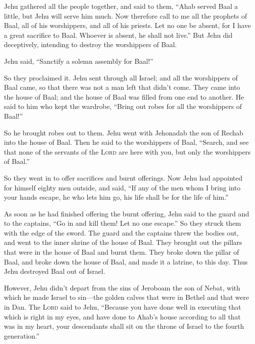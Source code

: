  Jehu gathered all the people together, and said to them,
``Ahab served Baal a little, but Jehu will serve him much.
 Now therefore call to me all the prophets of Baal, all
of his worshippers, and all of his priests. Let no one be absent, for I
have a great sacrifice to Baal. Whoever is absent, he shall not live.''
But Jehu did deceptively, intending to destroy the worshippers of Baal.

 Jehu said, ``Sanctify a solemn assembly for Baal!''

So they proclaimed it.  Jehu sent through all Israel; and
all the worshippers of Baal came, so that there was not a man left that
didn't come. They came into the house of Baal; and the house of Baal was
filled from one end to another.  He said to him who kept
the wardrobe, ``Bring out robes for all the worshippers of Baal!''

So he brought robes out to them.  Jehu went with
Jehonadab the son of Rechab into the house of Baal. Then he said to the
worshippers of Baal, ``Search, and see that none of the servants of the
\textsc{Lord} are here with you, but only the worshippers of Baal.''

 So they went in to offer sacrifices and burnt offerings.
Now Jehu had appointed for himself eighty men outside, and said, ``If
any of the men whom I bring into your hands escape, he who lets him go,
his life shall be for the life of him.''

 As soon as he had finished offering the burnt offering,
Jehu said to the guard and to the captains, ``Go in and kill them! Let
no one escape.'' So they struck them with the edge of the sword. The
guard and the captains threw the bodies out, and went to the inner
shrine of the house of Baal.  They brought out the
pillars that were in the house of Baal and burnt them. 
They broke down the pillar of Baal, and broke down the house of Baal,
and made it a latrine, to this day.  Thus Jehu destroyed
Baal out of Israel.

 However, Jehu didn't depart from the sins of Jeroboam
the son of Nebat, with which he made Israel to sin---the golden calves
that were in Bethel and that were in Dan.  The
\textsc{Lord} said to Jehu, ``Because you have done well in executing
that which is right in my eyes, and have done to Ahab's house according
to all that was in my heart, your descendants shall sit on the throne of
Israel to the fourth generation.''

